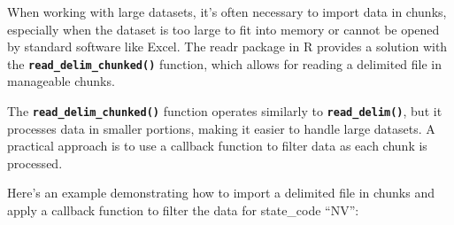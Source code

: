 \documentclass[
]{book}
\newenvironment{Shaded}{\begin{snugshade}}{\end{snugshade}}
\newcommand{\AttributeTok}[1]{\textcolor[rgb]{0.13,0.29,0.53}{#1}}
\newcommand{\CommentTok}[1]{\textcolor[rgb]{0.56,0.35,0.01}{\textit{#1}}}
\newcommand{\ConstantTok}[1]{\textcolor[rgb]{0.56,0.35,0.01}{#1}}
\newcommand{\ControlFlowTok}[1]{\textcolor[rgb]{0.13,0.29,0.53}{\textbf{#1}}}
\newcommand{\DecValTok}[1]{\textcolor[rgb]{0.00,0.00,0.81}{#1}}
\newcommand{\FunctionTok}[1]{\textcolor[rgb]{0.13,0.29,0.53}{\textbf{#1}}}
\newcommand{\NormalTok}[1]{#1}
\newcommand{\OtherTok}[1]{\textcolor[rgb]{0.56,0.35,0.01}{#1}}
\newcommand{\SpecialCharTok}[1]{\textcolor[rgb]{0.81,0.36,0.00}{\textbf{#1}}}
\newcommand{\StringTok}[1]{\textcolor[rgb]{0.31,0.60,0.02}{#1}}
\begin{document}
When working with large datasets, it's often necessary to import data in chunks, especially when the dataset is too large to fit into memory or cannot be opened by standard software like Excel. The readr package in R provides a solution with the \textbf{\texttt{read\_delim\_chunked()}} function, which allows for reading a delimited file in manageable chunks.

The \textbf{\texttt{read\_delim\_chunked()}} function operates similarly to \textbf{\texttt{read\_delim()}}, but it processes data in smaller portions, making it easier to handle large datasets. A practical approach is to use a callback function to filter data as each chunk is processed.

Here's an example demonstrating how to import a delimited file in chunks and apply a callback function to filter the data for state\_code ``NV'':

\begin{Shaded}
\end{Shaded}
\end{document}
